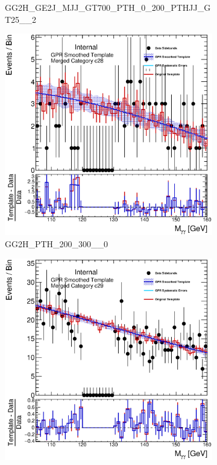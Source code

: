 \begin{figure}
\begin{center}
\begin{subfigure}[T]{0.49\linewidth}
	\caption{\tiny{GG2H\_GE2J\_MJJ\_GT700\_PTH\_0\_200\_PTHJJ\_GT25\_\_2}}
\end{subfigure}
\begin{subfigure}[T]{0.49\linewidth}
	\centering
	\includegraphics[width=\linewidth]{figures/background/gpr/coupCatTemplates/GPR_Smoothed_Plot_hmgg_c28.eps}
	\caption{GG2H\_PTH\_200\_300\_\_0}
\end{subfigure}
\begin{subfigure}[T]{0.49\linewidth}
	\centering
	\includegraphics[width=\linewidth]{figures/background/gpr/coupCatTemplates/GPR_Smoothed_Plot_hmgg_c29.eps}

\end{subfigure}
\end{center}
\end{figure}
